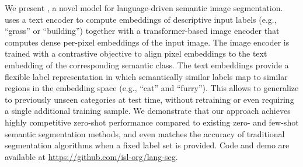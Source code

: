 We present \methodname{}, a novel model for language-driven semantic image segmentation. \methodname{} uses a text encoder to compute embeddings of descriptive input labels (e.g., ``grass'' or ``building'') together with a transformer-based image encoder that computes dense per-pixel embeddings of the input image. The image encoder is trained with a contrastive objective to align pixel embeddings to the text embedding of the corresponding semantic class. The text embeddings provide a flexible label representation in which semantically similar labels map to similar regions in the embedding space (e.g., ``cat'' and ``furry''). This allows \methodname{} to generalize to previously unseen categories at test time, without retraining or even requiring a single additional training sample. We demonstrate that our approach achieves highly competitive zero-shot performance compared to existing zero- and few-shot semantic segmentation methods, and even matches the accuracy of traditional segmentation algorithms when a fixed label set is provided. Code and demo are available at \href{https://github.com/isl-org/lang-seg}{https://github.com/isl-org/lang-seg}.
